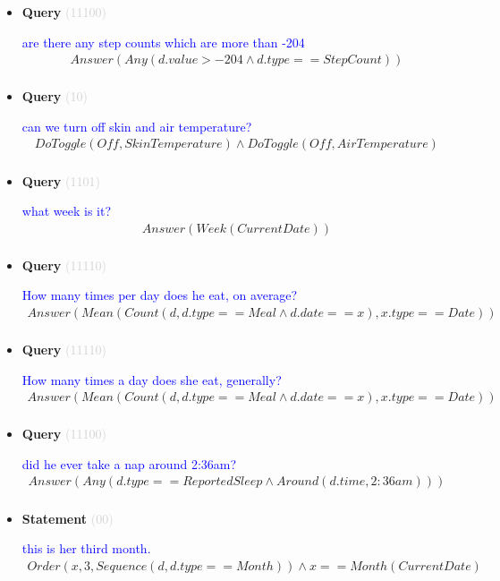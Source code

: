 \documentclass[11pt]{article}
\newcommand{\key}[1]{\textcolor{lightgray}{#1}}
\newcounter{CQuery}
\newcounter{CStatement}
\begin{document}
\begin{itemize}
\item
\textbf{Query\theCQuery} \key{(11100)} \addtocounter{CQuery}{1}
\textcolor{blue}{ are there any step counts which are more than -204 }
\begin{multline*}
Answer(Any(d.value>-204 \wedge d.type==StepCount)) \\ 
\end{multline*}


\item
\textbf{Query\theCQuery} \key{(10)} \addtocounter{CQuery}{1}
\textcolor{blue}{ can we turn off skin and air temperature? }
\begin{multline*}
DoToggle(Off, SkinTemperature) \wedge DoToggle(Off, AirTemperature) \\ 
\end{multline*}


\item
\textbf{Query\theCQuery} \key{(1101)} \addtocounter{CQuery}{1}
\textcolor{blue}{ what week is it? }
\begin{multline*}
Answer(Week(CurrentDate)) \\ 
\end{multline*}


\item
\textbf{Query\theCQuery} \key{(11110)} \addtocounter{CQuery}{1}
\textcolor{blue}{ How many times per day does he eat, on average? }
\begin{multline*}
Answer(Mean(Count(d, d.type==Meal \wedge d.date==x), x.type==Date)) \\ 
\end{multline*}


\item
\textbf{Query\theCQuery} \key{(11110)} \addtocounter{CQuery}{1}
\textcolor{blue}{ How many times a day does she eat, generally? }
\begin{multline*}
Answer(Mean(Count(d, d.type==Meal \wedge d.date==x), x.type==Date)) \\ 
\end{multline*}


\item
\textbf{Query\theCQuery} \key{(11100)} \addtocounter{CQuery}{1}
\textcolor{blue}{ did he ever take a nap around 2:36am? }
\begin{multline*}
Answer(Any(d.type==ReportedSleep \wedge Around(d.time, 2:36am))) \\ 
\end{multline*}


\item
\textbf{Statement\theCStatement} \key{(00)} \addtocounter{CStatement}{1}
\textcolor{blue}{ this is her third month. }
\begin{multline*}
Order(x, 3, Sequence(d, d.type==Month)) \wedge x==Month(CurrentDate) \\ 
\end{multline*}



\end{itemize}
\end{document}
